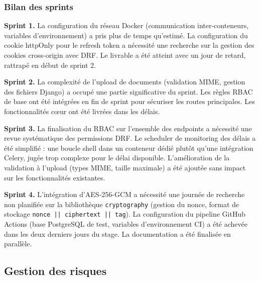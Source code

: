 \subsubsection{Bilan des sprints}

\textbf{Sprint 1.} La configuration du réseau Docker (communication inter-conteneurs, variables d'environnement) a pris plus de temps qu'estimé. La configuration du cookie httpOnly pour le refresh token a nécessité une recherche sur la gestion des cookies cross-origin avec DRF. Le livrable a été atteint avec un jour de retard, rattrapé en début de sprint 2.

\textbf{Sprint 2.} La complexité de l'upload de documents (validation MIME, gestion des fichiers Django) a occupé une partie significative du sprint. Les règles RBAC de base ont été intégrées en fin de sprint pour sécuriser les routes principales. Les fonctionnalités cœur ont été livrées dans les délais.

\textbf{Sprint 3.} La finalisation du RBAC sur l'ensemble des endpoints a nécessité une revue systématique des permissions DRF. Le scheduler de monitoring des délais a été simplifié : une boucle shell dans un conteneur dédié plutôt qu'une intégration Celery, jugée trop complexe pour le délai disponible. L'amélioration de la validation à l'upload (types MIME, taille maximale) a été ajoutée sans impact sur les fonctionnalités existantes.

\textbf{Sprint 4.} L'intégration d'AES-256-GCM a nécessité une journée de recherche non planifiée sur la bibliothèque \texttt{cryptography} (gestion du nonce, format de stockage \texttt{nonce || ciphertext || tag}). La configuration du pipeline GitHub Actions (base PostgreSQL de test, variables d'environnement CI) a été achevée dans les deux derniers jours du stage. La documentation a été finalisée en parallèle.

\subsection{Gestion des risques}

